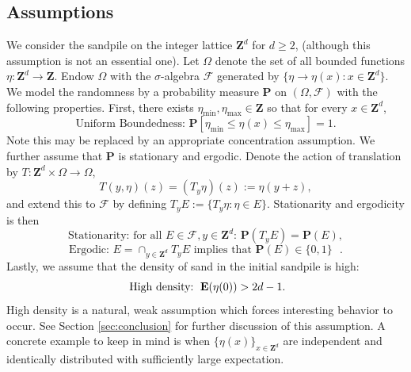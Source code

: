 \documentclass[12pt]{amsart}
\newcommand{\Z}{\mathbf{Z}}
\newcommand{\E}{\mathop{\bf E{}}}
\begin{document}


\subsection{Assumptions}  \label{subsec:assumptions}
We consider the sandpile on the integer lattice $\Z^d$ for $d \geq 2$, (although this assumption is not an essential one). 
Let $\Omega$ denote the set of all bounded functions $\eta: \Z^d \to \Z$.  Endow $\Omega$ with the $\sigma$-algebra $\mathcal{F}$ generated by $\{ \eta \to \eta(x) : x \in \Z^d\}$. We model the randomness by a probability measure $\mathbf{P}$ on $(\Omega, \mathcal{F})$ with the following properties. First,  there exists $\eta_{\min}, \eta_{\max} \in \Z$ so that for every $x \in \Z^d$, 
\begin{equation}
\mbox{Uniform Boundedness: }  \mathbf{P}\left[ \eta_{\min} \leq \eta(x) \leq \eta_{\max} \right] = 1. 
\end{equation} 
Note this may be replaced by an appropriate concentration assumption. We further assume that $\mathbf{P}$ is \mbox{stationary} and \mbox{ergodic}. Denote the action of translation by $T: \Z^d \times \Omega \to \Omega$, 
\[
T(y, \eta)(z) = (T_y \eta)(z) := \eta(y + z),
\]
and extend this to $\mathcal{F}$ by defining  $T_y E := \{ T_y \eta : \eta \in E\}$. Stationarity and ergodicity is then
\begin{equation}
\mbox{Stationarity: for all $E \in \mathcal{F}, y \in \Z^d$: } \mathbf{P}(T_y E) = \mathbf{P}(E),
\end{equation}
\begin{equation}
\mbox{Ergodic:  $E = \cap_{y \in \Z^d} T_y E$ implies that $\mathbf{P}(E) \in \{0,1\}$ } . 
\end{equation}
Lastly, we assume that the density of sand in the initial sandpile is high:
\begin{equation}
\mbox{ High density: }  \E(\eta(0)) > 2 d - 1. 
\end{equation}
High density is a natural, weak assumption which forces interesting behavior to occur. See Section \ref{sec:conclusion} for further discussion of this assumption. A concrete example to keep in mind 
is when $\{\eta(x)\}_{x \in \Z^d}$ are independent and identically distributed with sufficiently large expectation. 
\end{document}
